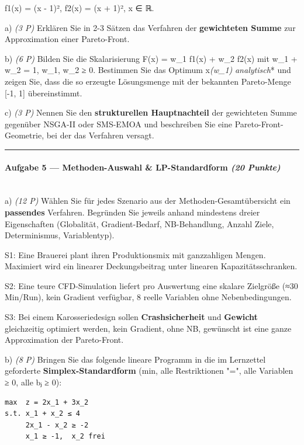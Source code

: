 \documentclass[11pt, a4paper]{article}
\begin{document}
f1(x) = (x - 1)², f2(x) = (x + 1)², x ∈ ℝ.


a) \textit{(3 P)} Erklären Sie in 2-3 Sätzen das Verfahren der \textbf{gewichteten Summe} zur Approximation einer Pareto-Front.


b) \textit{(6 P)} Bilden Sie die Skalarisierung F(x) = w\_1 f1(x) + w\_2 f2(x) mit w\_1 + w\_2 = 1, w\_1, w\_2 ≥ 0. Bestimmen Sie das Optimum x\textit{(w\_1) }\textit{analytisch}* und zeigen Sie, dass die so erzeugte Lösungsmenge mit der bekannten Pareto-Menge [-1, 1] übereinstimmt.


c) \textit{(3 P)} Nennen Sie den \textbf{strukturellen Hauptnachteil} der gewichteten Summe gegenüber NSGA-II oder SMS-EMOA und beschreiben Sie eine Pareto-Front-Geometrie, bei der das Verfahren versagt.



\noindent\textcolor{rulegray}{\rule{\linewidth}{0.4pt}}


\paragraph{Aufgabe 5 — Methoden-Auswahl \& LP-Standardform \textit{(20 Punkte)}}\mbox{}\\[2pt]

a) \textit{(12 P)} Wählen Sie für jedes Szenario aus der Methoden-Gesamtübersicht ein \textbf{passendes} Verfahren. Begründen Sie jeweils anhand mindestens dreier Eigenschaften (Globalität, Gradient-Bedarf, NB-Behandlung, Anzahl Ziele, Determinismus, Variablentyp).


S1: Eine Brauerei plant ihren Produktionsmix mit ganzzahligen Mengen. Maximiert wird ein linearer Deckungsbeitrag unter linearen Kapazitätsschranken.


S2: Eine teure CFD-Simulation liefert pro Auswertung eine skalare Zielgröße (≈30 Min/Run), kein Gradient verfügbar, 8 reelle Variablen ohne Nebenbedingungen.


S3: Bei einem Karosseriedesign sollen \textbf{Crashsicherheit} und \textbf{Gewicht} gleichzeitig optimiert werden, kein Gradient, ohne NB, gewünscht ist eine ganze Approximation der Pareto-Front.


b) \textit{(8 P)} Bringen Sie das folgende lineare Programm in die im Lernzettel geforderte \textbf{Simplex-Standardform} (min, alle Restriktionen "=", alle Variablen ≥ 0, alle bⱼ ≥ 0):


\begin{lstlisting}
max  z = 2x_1 + 3x_2
s.t. x_1 + x_2 ≤ 4
     2x_1 - x_2 ≥ -2
     x_1 ≥ -1,  x_2 frei
\end{lstlisting}
\end{document}
